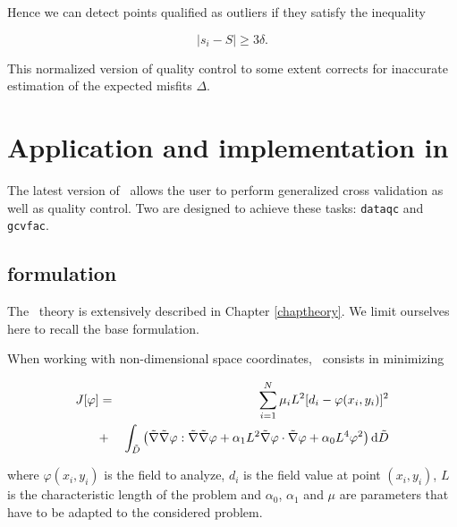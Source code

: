 Hence we can detect points qualified as outliers if they satisfy the inequality

\begin{equation}
|s_i-S | \ge 3 \delta.
\label{eq:qc4}
\end{equation}
 
This normalized version of quality control to some extent corrects for inaccurate estimation of the expected misfits $\Delta$.

 


\section{Application and implementation in \diva\label{sec:divagcv}}

The latest version of \diva\, allows the user to perform generalized cross validation as well as quality control. Two are designed to achieve these tasks: \texttt{dataqc} and \texttt{gcvfac}.


\subsection{\diva\divaspace formulation}

The \diva\, theory is extensively described in Chapter \ref{chaptheory}. We limit ourselves here to recall the base formulation.

When working with non-dimensional space coordinates, \diva\, consists in minimizing

\begin{eqnarray}
{J}[\varphi]&=&\sum_{i=1}^{N}\mu_i L^2 [d_{i}-\varphi(x_{i},y_{i})]^{2}\\ \notag 
&+ &
 \int_{\tilde{D}}\left(
 \tilde{\nabla}\tilde{\nabla}\varphi : \tilde{\nabla}\tilde{\nabla}\varphi + { \alpha_{1} L^2}
\tilde{\nabla}\varphi \cdot \tilde{\nabla}\varphi + \alpha_{0} L^4 \varphi^{2} \right) \mbox{d} \tilde{D}
\end{eqnarray}

where $\varphi(x_{i},y_{i})$ is the field to analyze, $d_{i}$ is the field value at point $(x_i,y_i)$, $L$ is the characteristic length of the problem and $\alpha_{0}$, $\alpha_{1}$ and $\mu$ are parameters that have to be adapted to the considered problem. 


